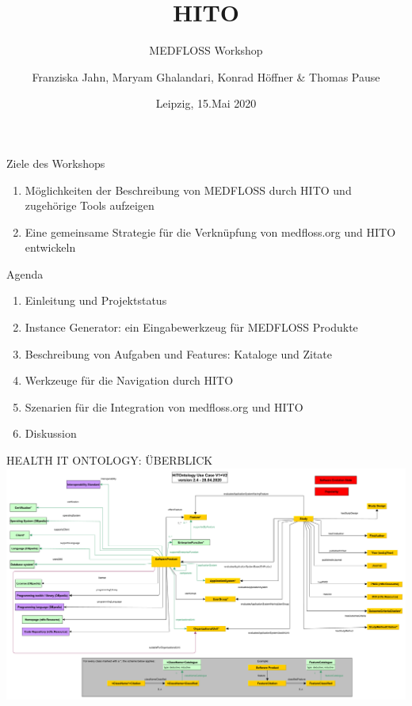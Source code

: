 \documentclass[aspectratio=1610,12pt]{beamer}
\author{Franziska Jahn, Maryam Ghalandari, Konrad Höffner \& Thomas Pause}
\date{Leipzig, 15.Mai 2020}
\title{HITO}
\subtitle{MEDFLOSS Workshop}
\begin{document}
\begin{frame}
\titlepage
\end{frame}

\begin{frame}{Ziele des Workshops}
\begin{spacing}{1.5}
  \begin{enumerate}
    \item Möglichkeiten der Beschreibung von MEDFLOSS durch HITO und zugehörige Tools aufzeigen
    \item Eine gemeinsame Strategie für die Verknüpfung von medfloss.org und HITO entwickeln
  \end{enumerate}
\end{spacing}
\end{frame}

\begin{frame}{Agenda}
  \begin{spacing}{1.5}
    \begin{enumerate}
      \item Einleitung und Projektstatus
      \item Instance Generator: ein Eingabewerkzeug für MEDFLOSS Produkte
      \item Beschreibung von Aufgaben und Features: Kataloge und Zitate
      \item Werkzeuge für die Navigation durch HITO
      \item Szenarien für die Integration von medfloss.org und HITO
      \item Diskussion
    \end{enumerate}
  \end{spacing}
\end{frame}

\begin{frame}{HEALTH IT ONTOLOGY: ÜBERBLICK}
\centering
\includegraphics[width=.95\textwidth]{img/HITontology.pdf}
\end{frame}
\end{document}
